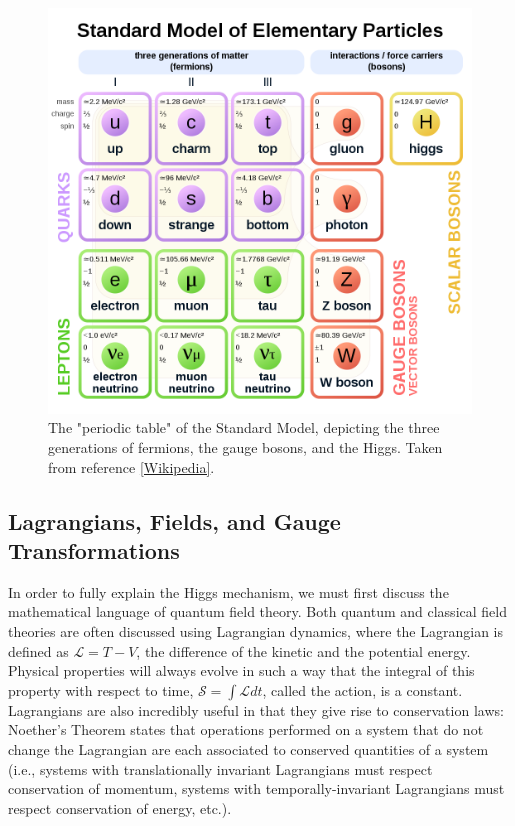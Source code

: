 \begin{figure}
\includegraphics[width=\linewidth]{figures/theory_chapter/SM.png}
\caption{The "periodic table" of the Standard Model, depicting the three generations of fermions, the gauge bosons, and the Higgs. Taken from reference \ref{Wikipedia}.}
\end{figure}

\subsection{Lagrangians, Fields, and Gauge Transformations}\label{sec:Lagrangians}

In order to fully explain the Higgs mechanism, we must first discuss the mathematical language of quantum field theory. Both quantum and classical field theories are often discussed using Lagrangian dynamics, where the Lagrangian is defined as  $\mathcal{L} = T - V$, the difference of the kinetic and the potential energy. Physical properties will always evolve in such a way that the integral of this property with respect to time, $\mathcal{S} = \int \mathcal{L} dt$, called the action, is a constant. Lagrangians are also incredibly useful in that they give rise to conservation laws: Noether's Theorem states that operations performed on a system that do not change the Lagrangian are each associated to conserved quantities of a system (i.e., systems with translationally invariant Lagrangians must respect conservation of momentum, systems with temporally-invariant Lagrangians must respect conservation of energy, etc.).

